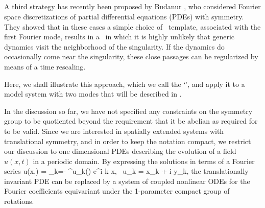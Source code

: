 \subsection{\FFslice}
\label{sect:fFslice}

A third strategy has recently been proposed by Budanur
\etal{}, who considered Fourier space discretizations of
partial differential equations (PDEs) with  symmetry. They showed
that in these cases a simple choice of \slice\ template, associated with
the first Fourier mode, results in a \slice\ in which it is highly
unlikely that generic dynamics visit the neighborhood of the singularity.
If the dynamics do occasionally come near the singularity, these close
passages can be regularized by means of a time rescaling.

Here, we shall illustrate this approach, which we call the
`\fFslice', and apply it to a model system with two modes that will be
described in .

In the discussion so far, we have not specified any constraints on the symmetry group
to be quotiented beyond the requirement that it be abelian as required for 
to be valid. Since we are interested in spatially extended systems with
translational symmetry, and in order to keep the notation compact,
we restrict our discussion to one dimensional PDEs describing
the evolution of a field $u(x,t)$ in a periodic domain.
By expressing the solutions in terms of a Fourier series
\beq
   u(x,\zeit) = \sum\limits_{k=- \infty}^\infty u_k\left(\zeit\right) e^{i k x}, \,\,\,u_k = x_k + i y_k,
the translationally invariant PDE can be replaced by a system of coupled nonlinear
ODEs for the Fourier coefficients equivariant under the 1-parameter compact group of  rotations.

